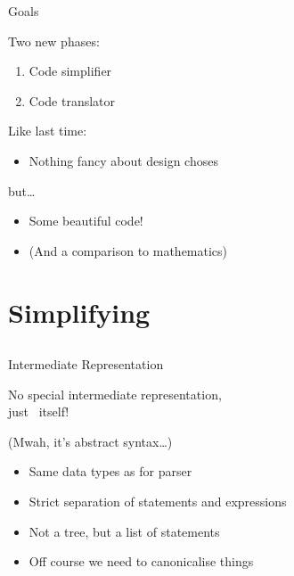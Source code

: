 \begin{frame}{Goals}

  Two new phases:

  \begin{enumerate}
    \item Code simplifier
    \item Code translator
  \end{enumerate}

  \pause

  Like last time:

  \begin{itemize}
    \item Nothing fancy about design choses
  \end{itemize}

  but\ldots
  \pause

  \begin{itemize}
    \item Some beautiful code!
    \item (And a comparison to mathematics)
  \end{itemize}

\end{frame}

\section{Simplifying}
\subsection*{}

\begin{frame}[fragile]{Intermediate Representation}
  
  No special intermediate representation,\\
  just \SPL\ itself!

  \pause
  \medskip

  (Mwah, it's abstract syntax\ldots)

  \begin{itemize}
      \item Same data types as for parser
      \item Strict separation of statements and expressions
      \item Not a tree, but a list of statements
      \item Off course we need to canonicalise things
  \end{itemize}

\end{frame}

